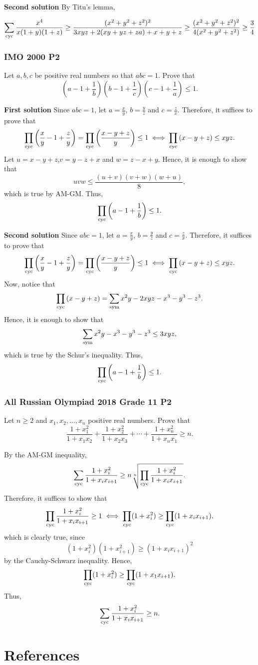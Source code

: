 \documentclass[12pt]{article}
\begin{document}
\textcolor{color1}{\textbf{Second solution}} By Titu's lemma,

\[
	\sum_{\text{cyc}} \frac{x^4}{x(1+y)(1+z)} \geq \frac{(x^2+y^2+z^2)^2}{3xyz+2(xy+yz+za)+x+y+z} \geq \frac{(x^2+y^2+z^2)^2}{4(x^2+y^2+z^2)} \geq \frac{3}{4}
\]
\clearpage

\subsubsection{IMO 2000 P2}
\begin{problem}
Let $ a, b, c$ be positive real numbers so that $ abc = 1$. Prove that
\[
	\left( a - 1 + \frac 1b \right) \left( b - 1 + \frac 1c \right) \left( c - 1 + \frac 1a \right) \leq 1.
\]
\end{problem}

\textbf{\textcolor{color1}{First solution}} Since $abc=1$, let $a=\frac{x}{y}$, $b=\frac{y}{z}$ and $c=\frac{z}{x}$. Therefore, it suffices to prove that
\[
	\prod_{\text{cyc}} \left(\frac{x}{y}-1+\frac{z}{y}\right) = \prod_{\text{cyc}} \left(\frac{x-y+z}{y}\right) \le 1 \iff
	\prod_{\text{cyc}} \left(x-y+z\right) \le xyz.
\]
Let $u=x-y+z$,$v=y-z+x$ and $w=z-x+y$. Hence, it is enough to show that
\[
	uvw \le \frac{(u+v)(v+w)(w+u)}{8},
\]
which is true by AM-GM. Thus,
\[
	\prod_{\text{cyc}} \left( a - 1 + \frac 1b \right) \le 1.
\]

\textbf{\textcolor{color1}{Second solution}} Since $abc=1$, let $a=\frac{x}{y}$, $b=\frac{y}{z}$ and $c=\frac{z}{x}$. Therefore, it suffices to prove that
\[
	\prod_{\text{cyc}} \left(\frac{x}{y}-1+\frac{z}{y}\right) = \prod_{\text{cyc}} \left(\frac{x-y+z}{y}\right) \le 1 \iff
	\prod_{\text{cyc}} \left(x-y+z\right) \le xyz.
\]
Now, notice that
\[
	\prod_{\text{cyc}} \left(x-y+z\right) = \sum_{\text{sym}} x^2y -2xyz -x^3-y^3-z^3.
\]
Hence, it is enough to show that
\[
	\sum_{\text{sym}} x^2y -x^3-y^3-z^3 \le 3xyz,
\]
which is true by the Schur's inequality. Thus,
\[
	\prod_{\text{cyc}} \left( a - 1 + \frac 1b \right) \le 1.
\]
\clearpage

\subsubsection{All Russian Olympiad 2018 Grade 11 P2}
\begin{problem}
Let $n\geq 2$ and $x_{1},x_{2},\ldots,x_{n}$ positive real numbers. Prove that
\[
	\frac{1+x_{1}^2}{1+x_{1}x_{2}}+\frac{1+x_{2}^2}{1+x_{2}x_{3}}+\cdots+\frac{1+x_{n}^2}{1+x_{n}x_{1}}\geq n.
\]
\end{problem}

By the AM-GM inequality,
\[
	\sum_{\text{cyc}} \frac{1+x^2_i}{1+x_ix_{i+1}} \ge
	n\sqrt[n]{\prod_{\text{cyc}} \frac{1+x^2_i}{1+x_ix_{i+1}}}.
\]
Therefore, it suffices to show that
\[
	\prod_{\text{cyc}} \frac{1+x^2_i}{1+x_ix_{i+1}} \ge
	1 \iff \prod_{\text{cyc}} (1+x^2_i) \ge \prod_{\text{cyc}} (1+x_ix_{i+1}),
\]
which is clearly true, since
\[
	(1+x^2_i)(1+x^2_{i+1}) \ge (1+x_ix_{i+1})^2
\]
by the Cauchy-Schwarz inequality. Hence,
\[
	\prod_{\text{cyc}} (1+x^2_i) \ge \prod_{\text{cyc}} (1+x_1x_{i+1}).
\]
Thus,
\[
	\sum_{\text{cyc}} \frac{1+x^2_i}{1+x_ix_{i+1}} \ge n.
\]

\clearpage
\section{\textsf{References}}\label{sec:references}
\end{document}

